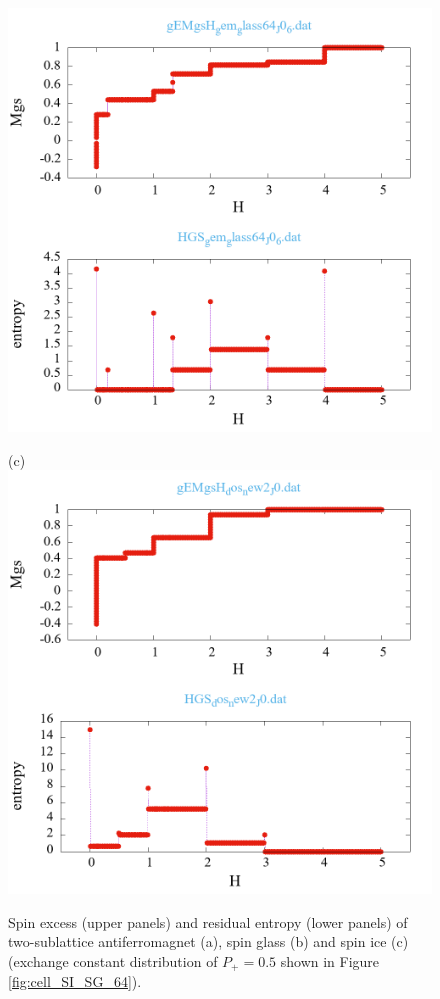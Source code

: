 \documentclass[preprint,12pt]{elsarticle}
\begin{document}
\begin{figure}[H]
\begin{minipage}[h]{0.32\linewidth}
			\includegraphics[width=1\linewidth]{pictures/_multiplot_SG64_J0}
		\end{minipage}
		\hfill
		\begin{minipage}[h]{0.32\linewidth}
			\centering
			\hspace{1cm}(c)
			\includegraphics[width=1\linewidth]{pictures/_multiplot_SI64_J0}
		\end{minipage}
		
		\caption{Spin excess (upper panels) and residual entropy (lower panels) of two-sublattice antiferromagnet (a), spin glass (b) and spin ice (c) (exchange constant distribution of $P_+ = 0.5$ shown in Figure \ref{fig:cell_SI_SG_64}).}
		\label{fig:_multiplot_SI_SG_64}
		
	\end{figure}
\end{document}

